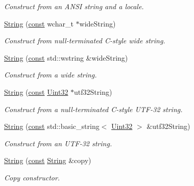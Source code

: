 \begin{DoxyCompactItemize}
\begin{DoxyCompactList}\small\item\em Construct from an A\-N\-S\-I string and a locale. \end{DoxyCompactList}\item 
\hyperlink{classsf_1_1_string_a5742d0a9b0c754f711820c2b5c40fa55}{String} (\hyperlink{term__entry_8h_a57bd63ce7f9a353488880e3de6692d5a}{const} wchar\-\_\-t $\ast$wide\-String)
\begin{DoxyCompactList}\small\item\em Construct from null-\/terminated C-\/style wide string. \end{DoxyCompactList}\item 
\hyperlink{classsf_1_1_string_a5e38151340af4f9a5f74ad24c0664074}{String} (\hyperlink{term__entry_8h_a57bd63ce7f9a353488880e3de6692d5a}{const} std\-::wstring \&wide\-String)
\begin{DoxyCompactList}\small\item\em Construct from a wide string. \end{DoxyCompactList}\item 
\hyperlink{classsf_1_1_string_aea3629adf19f9fe713d4946f6c75b214}{String} (\hyperlink{term__entry_8h_a57bd63ce7f9a353488880e3de6692d5a}{const} \hyperlink{namespacesf_aa746fb1ddef4410bddf198ebb27e727c}{Uint32} $\ast$utf32\-String)
\begin{DoxyCompactList}\small\item\em Construct from a null-\/terminated C-\/style U\-T\-F-\/32 string. \end{DoxyCompactList}\item 
\hyperlink{classsf_1_1_string_a6eee86dbe75d16bbcc26e97416c2e1ca}{String} (\hyperlink{term__entry_8h_a57bd63ce7f9a353488880e3de6692d5a}{const} std\-::basic\-\_\-string$<$ \hyperlink{namespacesf_aa746fb1ddef4410bddf198ebb27e727c}{Uint32} $>$ \&utf32\-String)
\begin{DoxyCompactList}\small\item\em Construct from an U\-T\-F-\/32 string. \end{DoxyCompactList}\item 
\hyperlink{classsf_1_1_string_af862594d3c4070d8ddbf08cf8dce4f59}{String} (\hyperlink{term__entry_8h_a57bd63ce7f9a353488880e3de6692d5a}{const} \hyperlink{classsf_1_1_string}{String} \&copy)
\begin{DoxyCompactList}\small\item\em Copy constructor. \end{DoxyCompactList}\item 

\end{DoxyCompactItemize}
